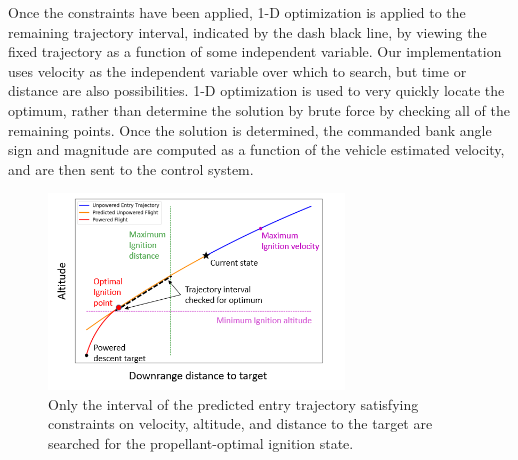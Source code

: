 \documentclass[letterpaper, paper,11pt]{AAS}
\begin{document}
Once the constraints have been applied, 1-D optimization is applied to the remaining trajectory interval, indicated by the dash black line, by viewing the fixed trajectory as a function of some independent variable. Our implementation uses velocity as the independent variable over which to search, but time or distance are also possibilities. 1-D optimization is used to very quickly locate the optimum, rather than determine the solution by brute force by checking all of the remaining points. Once the solution is determined, the commanded bank angle sign and magnitude are computed as a function of the vehicle estimated velocity, and are then sent to the control system.
\begin{figure}[h!]
	\centering
	\includegraphics[width=0.7\textwidth]{H_Vs_S} 
	\caption{Only the interval of the predicted entry trajectory satisfying constraints on velocity, altitude, and distance to the target are searched for the propellant-optimal ignition state.}
	\label{fig_ignition}
\end{figure}
\end{document}
